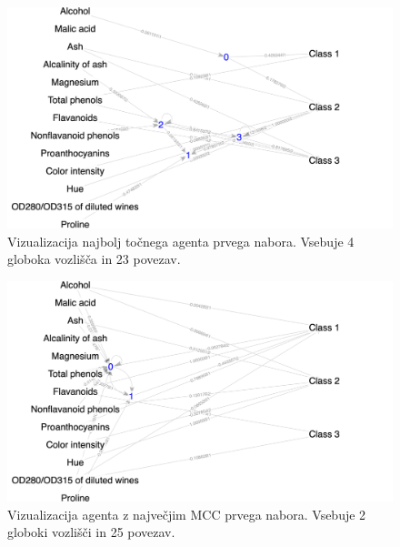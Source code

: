 \begin{figure}[H]
    \begin{center}
        \includegraphics[width=13cm]{wine/1/acc_g}
    \end{center}
    \caption{Vizualizacija najbolj točnega agenta prvega nabora. Vsebuje 4 globoka vozlišča in 23 povezav.}
    \label{fig:wine_acc_1_g}
\end{figure}

\begin{figure}[H]
    \begin{center}
        \includegraphics[width=13cm]{wine/1/mcc_g}
    \end{center}
    \caption{Vizualizacija agenta z največjim MCC prvega nabora. Vsebuje 2 globoki vozlišči in 25 povezav.}
    \label{fig:wine_mcc_1_g}
\end{figure}

